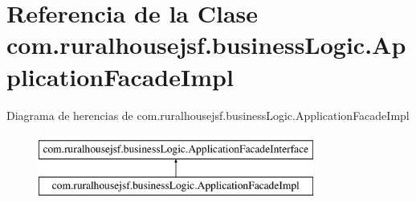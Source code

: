 \hypertarget{classcom_1_1ruralhousejsf_1_1business_logic_1_1_application_facade_impl}{}\section{Referencia de la Clase com.\+ruralhousejsf.\+business\+Logic.\+Application\+Facade\+Impl}
\label{classcom_1_1ruralhousejsf_1_1business_logic_1_1_application_facade_impl}
Diagrama de herencias de com.\+ruralhousejsf.\+business\+Logic.\+Application\+Facade\+Impl\begin{figure}[H]
\begin{center}
\leavevmode
\includegraphics[height=2.000000cm]{dc/dd7/classcom_1_1ruralhousejsf_1_1business_logic_1_1_application_facade_impl}
\end{center}
\end{figure}
